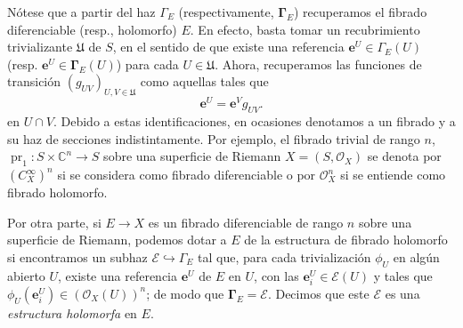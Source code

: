 \documentclass[12pt,a4paper]{article}
\theoremstyle{definition} \newtheorem{defn}[thm]{Definición}
\theoremstyle{definition} \newtheorem{ejemplo}[thm]{Ejemplo}
\theoremstyle{definition} \newtheorem{ejercicio}[thm]{Ejercicio}
\def\CC{\mathbb{C}}
\def\OO{\mathscr{O}}
\def\UU{\mathfrak{U}}
\DeclareMathOperator{\pr}{pr}
\begin{document}
	      Nótese que a partir del haz $\Gamma_E$ (respectivamente, $\boldsymbol{\Gamma}_E$) recuperamos el fibrado diferenciable (resp., holomorfo) $E$. En efecto, basta tomar un recubrimiento trivializante $\UU$ de $S$, en el sentido de que existe una referencia $\mathbf{e}^U \in \Gamma_E(U)$ (resp. $\mathbf{e}^U \in \boldsymbol{\Gamma}_E(U)$) para cada $U\in \UU$. Ahora, recuperamos las funciones de transición $(g_{UV})_{U,V \in \UU}$ como aquellas tales que 
	      \begin{equation*}
		\mathbf{e}^U = \mathbf{e}^V g_{UV}.
	      \end{equation*}
	      en $U\cap V$.
	      Debido a estas identificaciones, en ocasiones denotamos a un fibrado y a su haz de secciones indistintamente. Por ejemplo, el fibrado trivial de rango $n$, $\pr_1:S\times \CC^n \rightarrow S$ sobre una superficie de Riemann $X=(S,\OO_X)$ se denota por $(C^\infty_X)^n$ si se considera como fibrado diferenciable o por $\OO^n_X$ si se entiende como fibrado holomorfo.
	      
	      Por otra parte, si $E\rightarrow X$ es un fibrado diferenciable de rango $n$ sobre una superficie de Riemann, podemos dotar a $E$ de la estructura de fibrado holomorfo si encontramos un subhaz $\mathscr{E} \hookrightarrow \Gamma_E$ tal que, para cada trivialización $\phi_U$ en algún abierto $U$, existe una referencia $\mathbf{e}^U$ de $E$ en $U$, con las $\mathbf{e}_i^U \in \mathscr{E}(U)$ y tales que $\phi_U(\mathbf{e}_i^U) \in (\OO_X(U))^n$; de modo que $\boldsymbol{\Gamma}_E = \mathscr{E}$. Decimos que este $\mathscr{E}$ es una \emph{estructura holomorfa} en $E$.
\end{document}

